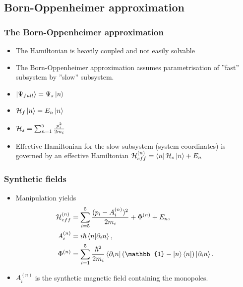 \documentclass[aspectratio=169]{beamer}
\begin{document}
\subsection{Born-Oppenheimer approximation}
\begin{frame}
\frametitle{The Born-Oppenheimer approximation}
\begin{itemize}
        \item The Hamiltonian is heavily coupled and not easily solvable
        \item The Born-Oppenheimer approximation assumes parametrisation of ''fast''
                subsystem by ''slow'' subsystem.
        \item \(\ket{\Psi_{full}} = \Psi_s\ket{n}\)
        \item \(\mathbb{\cal H}_f \ket{n} = E_n\ket{n}\)
        \item \(\mathbb{\cal H}_s = \sum_{n=1}^{5} \frac{p_i^2}{2m_i}\)
        \item Effective Hamiltonian for the slow subsystem (system coordinates) is governed
                by an effective Hamiltonian \(\mathbb{\cal H}^{(n)}_{eff} =
\bra{n}\mathbb{\cal H}_s\ket{n} + E_n\)
\end{itemize}\end{frame}
\begin{frame}
        \frametitle{Synthetic fields}
        \begin{itemize}
                \item Manipulation yields 
\begin{align}
        \mathbb{\cal H}^{(n)}_{eff} &= \sum_{i=5}^{5} \frac{(p_i - A^{(n)}_i)^2}{2m_i} + \Phi^{(n)} + E_n,\\
        A^{(n)}_i &= i\hbar{}\bra{n}\ket{\partial_i n},\\
        \Phi^{(n)} &= \sum_{i=1}^{5} \frac{\hbar{}^{2}}{2m_i}\bra{\partial_i n}(\mathbb{1} - \ket{n}
    \bra{n})\ket{\partial_i n}
.\end{align}
\item \(A_i^{(n)}\) is the synthetic magnetic field containing the monopoles.
        \end{itemize}
\end{frame}
\end{document}
